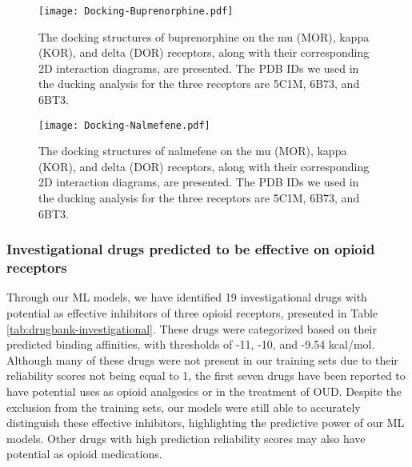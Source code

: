 \documentclass[10pt]{article}
\begin{document}
		
		
		\begin{figure}[ht]
			\centering
			\texttt{[image: Docking-Buprenorphine.pdf]} 
			\caption{{\footnotesize The docking structures of buprenorphine on the mu (MOR), kappa (KOR), and delta (DOR) receptors, along with their corresponding 2D interaction diagrams, are presented. The PDB IDs we used in the ducking analysis for the three receptors are 5C1M, 6B73, and 6BT3. } }
			\label{Fig:Docking-Buprenorphine}
		\end{figure} 
		
		
		\begin{figure}[ht]
			\centering
			\texttt{[image: Docking-Nalmefene.pdf]} 
			\caption{{\footnotesize The docking structures of nalmefene on the mu (MOR), kappa (KOR), and delta (DOR) receptors, along with their corresponding 2D interaction diagrams, are presented. The PDB IDs we used in the ducking analysis for the three receptors are 5C1M, 6B73, and 6BT3.	
			} }
			\label{Fig:Docking-Nalmefene}
		\end{figure} 
		
		\subsubsection{Investigational drugs predicted to be effective on opioid receptors}
		
		Through our ML models, we have identified 19 investigational drugs with potential as effective inhibitors of three opioid receptors, presented in Table \ref{tab:drugbank-investigational}. These drugs were categorized based on their predicted binding affinities, with thresholds of -11, -10, and -9.54 kcal/mol. Although many of these drugs were not present in our training sets due to their reliability scores not being equal to 1, the first seven drugs have been reported to have potential uses as opioid analgesics or in the treatment of OUD. Despite the exclusion from the training sets, our models were still able to accurately distinguish these effective inhibitors, highlighting the predictive power of our ML models. Other drugs with high prediction reliability scores may also have potential as opioid medications.
		
		
		
\end{document}
